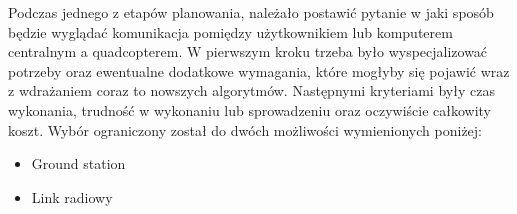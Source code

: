 Podczas jednego z etapów planowania, należało postawić pytanie w jaki sposób będzie wyglądać komunikacja pomiędzy użytkownikiem lub komputerem centralnym a quadcopterem. W pierwszym kroku trzeba było wyspecjalizować potrzeby oraz ewentualne dodatkowe wymagania, które mogłyby się pojawić wraz z wdrażaniem coraz to nowszych algorytmów. Następnymi kryteriami były czas wykonania, trudność w wykonaniu lub sprowadzeniu oraz oczywiście całkowity koszt. Wybór ograniczony został do dwóch możliwości wymienionych poniżej:

\begin{itemize}
\item Ground station
\item Link radiowy 
\end{itemize}